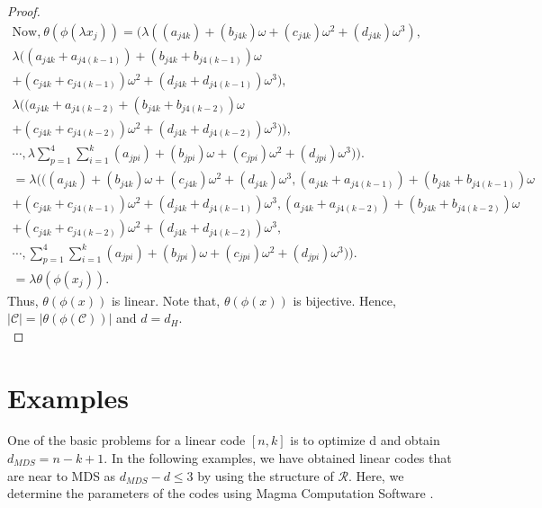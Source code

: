 \documentclass{amsart}
\theoremstyle{definition}
\theoremstyle{remark}
\numberwithin{equation}{section}
\begin{document}
\begin{proof}
\begin{gather*}
      \text{Now,}~\theta(\phi(\lambda x_j)) = (\lambda((a_{j4k})+(b_{j4k})\omega+(c_{j4k})\omega^2+(d_{j4k})\omega^3) ,\\ \lambda((a_{j4k}+a_{j4(k-1)})+(b_{j4k}+b_{j4(k-1)})\omega \\+(c_{j4k}+c_{j4(k-1)})\omega^2+(d_{j4k}+d_{j4(k-1)})\omega^3)  ,\\ \lambda((a_{j4k}+a_{j4(k-2)}+(b_{j4k}+b_{j4(k-2)})\omega \\+(c_{j4k}+c_{j4(k-2)})\omega^2+(d_{j4k}+d_{j4(k-2)})\omega^3)) ,\\
      \cdots ,  \lambda\sum_{p=1}^{4} \sum_{i=1}^{k} (a_{jpi})+(b_{jpi})\omega+(c_{jpi})\omega^2+(d_{jpi})\omega^3 )).
      \\= \lambda (((a_{j4k})+(b_{j4k})\omega+(c_{j4k})\omega^2+(d_{j4k})\omega^3 , (a_{j4k}+a_{j4(k-1)})+(b_{j4k}+b_{j4(k-1)})\omega\\ +(c_{j4k}+c_{j4(k-1)})\omega^2+(d_{j4k}+d_{j4(k-1)})\omega^3  , (a_{j4k}+a_{j4(k-2)})+(b_{j4k}+b_{j4(k-2)})\omega\\ +(c_{j4k}+c_{j4(k-2)})\omega^2+(d_{j4k}+d_{j4(k-2)})\omega^3 ,\\
      \cdots ,  \sum_{p=1}^{4} \sum_{i=1}^{k} (a_{jpi})+(b_{jpi})\omega+(c_{jpi})\omega^2+(d_{jpi})\omega^3 )).
      \\= \lambda\theta(\phi(x_j)).
  \end{gather*}\allowdisplaybreaks
  Thus, $\theta(\phi(x))$ is linear. Note that, $\theta(\phi(x))$ is bijective. Hence, $| \mathcal{C} |= | \theta(\phi(\mathcal{C})) |$ and $d=d_H$.\\
 \end{proof}
\section{Examples }\allowdisplaybreaks

 One of the basic problems for a linear code $[n, k]$ is to optimize d and obtain $d_{MDS} = n - k + 1$. In the following examples, we have obtained linear codes that are near to MDS as $ d_{MDS} - d \leq 3$ by using the structure of $\mathcal{R}$. Here, we determine the parameters of the codes using Magma Computation Software \cite{Bosma}.
\end{document}
